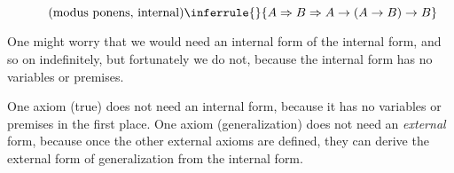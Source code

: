 \documentclass{article}
\begin{document}
  \begin{equation*}
    \tag{modus ponens, internal}
    \inferrule{}{\nameabstraction{A}{\nameabstraction{B}{A \implies (A \implies B) \implies B}}}\\
  \end{equation*}
  
  One might worry that we would need an internal form of the internal form, and so on indefinitely, but fortunately we do not, because the internal form has no variables or premises.
  
  One axiom (true) does not need an internal form, because it has no variables or premises in the first place. One axiom (generalization) does not need an \emph{external} form, because once the other external axioms are defined, they can derive the external form of generalization from the internal form.



\end{document}
